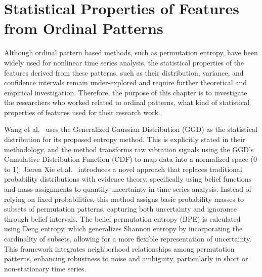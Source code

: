 \chapter{Statistical Properties of Features from Ordinal Patterns}\label{C:StatisitcalProperty}

Although ordinal pattern based methods, such as permutation entropy, have been widely used for nonlinear time series analysis, the statistical properties of the features derived from these patterns, such as their distribution, variance, and confidence intervals remain under-explored and require further theoretical and empirical investigation. Therefore, the purpose of this chapter is to investigate the researchers who worked related to ordinal patterns, what kind of statistical properties of features used for their research work.

Wang et al.~\cite{Wang2025} uses the Generalized Gaussian Distribution (GGD) as the statistical distribution for its proposed entropy method. This is explicitly stated in their methodology, and the method transforms raw vibration signals using the GGD's Cumulative Distribution Function (CDF) to map data into a normalized space (0 to 1).
Jieren Xie et.al.~\cite{bibid} introduces a novel approach that replaces traditional probability distributions with evidence theory, specifically using belief functions and mass assignments to quantify uncertainty in time series analysis. Instead of relying on fixed probabilities, this method assigns basic probability masses to subsets of permutation patterns, capturing both uncertainty and ignorance through belief intervals. The belief permutation entropy (BPE) is calculated using Deng entropy, which generalizes Shannon entropy by incorporating the cardinality of subsets, allowing for a more flexible representation of uncertainty. This framework integrates neighborhood relationships among permutation patterns, enhancing robustness to noise and ambiguity, particularly in short or non-stationary time series.

